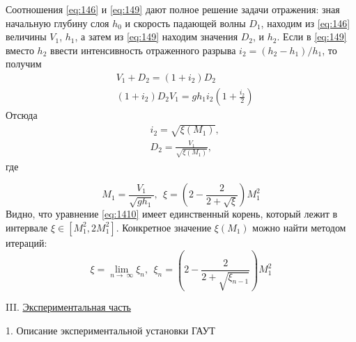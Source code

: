 \documentclass[specialist, subf, href, colorlinks=true, 14pt, final]{disser}
\theoremstyle{definition}
\begin{document}
Соотношения \eqref{eq:146} и \eqref{eq:149} дают полное решение задачи отражения: зная начальную глубину слоя $h_0$ и скорость падающей волны $D_1$, находим из \eqref{eq:146} величины $V_1$, $h_1$, а затем из \eqref{eq:149} находим значения $D_2$, и $h_2$. Если в \eqref{eq:149} вместо $h_2$ ввести интенсивность отраженного разрыва $i_{2} = (h_{2}-h_{1})/h_{1}$, то получим
\[
  \begin{aligned}
  & V_{1} + D_{2} = (1+i_{2})D_{2}\\
  & (1+i_{2})D_{2}V_{1} = gh_{1}i_{2}\left(1+\frac{i_2}{2}\right)
  \end{aligned}
\]
Отсюда
\[
  \begin{aligned}
  & i_{2} = \sqrt{\xi(M_{1})},\\
  & D_{2} = \frac{V_{1}}{\sqrt{\xi(M_{1})}},
  \end{aligned}
\]
где
\addtocounter{equation}{1}
\begin{equation}\label{eq:1410}
  M_{1} = \frac{V_{1}}{\sqrt{gh_1}},\ \ \xi = \left(2-\frac{2}{2+\sqrt{\xi}} \right)M_{1}^{2}
  \tag{10}
\end{equation}
Видно, что уравнение \eqref{eq:1410} имеет единственный корень, который лежит в интервале $\xi \in [M_{1}^{2}, 2M_{1}^{2}]$. Конкретное значение $\xi(M_{1})$ можно найти методом итераций:
\[
  \xi = \lim\limits_{n \rightarrow\ \infty}\xi_{n},\ \ \xi_{n} = \left(2 - \frac{2}{2+\sqrt{\xi_{n-1}}}\right) M_{1}^{2}
\]

\vspace{0.5cm}

\noindent III. \underline{Экспериментальная часть}

1. Описание экспериментальной установки ГАУТ
\end{document}
